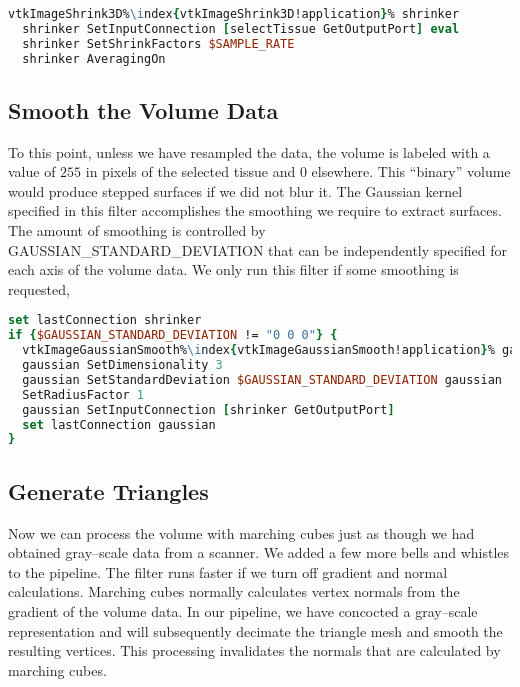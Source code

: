 \begin{lstlisting}[language=TCL, caption={Resample the Volume.}, escapechar=\%]
vtkImageShrink3D%\index{vtkImageShrink3D!application}% shrinker
  shrinker SetInputConnection [selectTissue GetOutputPort] eval
  shrinker SetShrinkFactors $SAMPLE_RATE
  shrinker AveragingOn
\end{lstlisting}

\subsection{Smooth the Volume Data}

To this point, unless we have resampled the data, the volume is labeled with a value of $255$ in pixels of the selected tissue and $0$ elsewhere. This ``binary'' volume would produce stepped surfaces if we did not blur it. The Gaussian kernel specified in this filter accomplishes the smoothing we require to extract surfaces. The amount of smoothing is controlled by  GAUSSIAN\_STANDARD\_DEVIATION that can be independently specified for each axis of the volume data. We only run this filter if some smoothing is requested,

\begin{lstlisting}[language=TCL, caption={Smooth the Volume Data.}, escapechar=\%]
set lastConnection shrinker
if {$GAUSSIAN_STANDARD_DEVIATION != "0 0 0"} {
  vtkImageGaussianSmooth%\index{vtkImageGaussianSmooth!application}% gaussian
  gaussian SetDimensionality 3
  gaussian SetStandardDeviation $GAUSSIAN_STANDARD_DEVIATION gaussian
  SetRadiusFactor 1
  gaussian SetInputConnection [shrinker GetOutputPort]
  set lastConnection gaussian
}
\end{lstlisting}

\subsection{Generate Triangles}

Now we can process the volume with marching cubes just as though we had obtained gray--scale data from a scanner. We added a few more bells and whistles to the pipeline. The filter runs faster if we turn off gradient and normal calculations. Marching cubes normally calculates vertex normals from the gradient of the volume data. In our pipeline, we have concocted a gray--scale representation and will subsequently decimate the triangle mesh and smooth the resulting vertices. This processing invalidates the normals that are calculated by marching cubes. 

